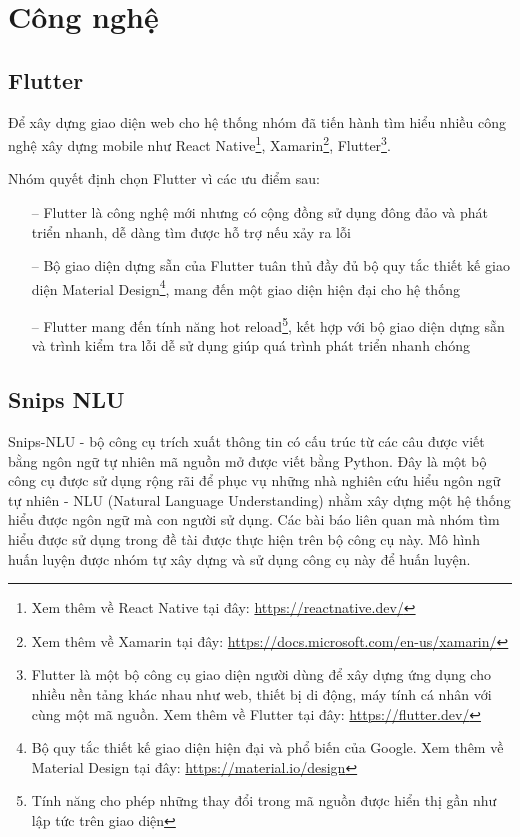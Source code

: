 \section{Công nghệ}

\subsection{Flutter}
Để xây dựng giao diện web cho hệ thống nhóm đã tiến hành tìm hiểu nhiều công nghệ xây dựng mobile như React Native\footnote{Xem thêm về React Native tại đây: \url{https://reactnative.dev/}}, Xamarin\footnote{Xem thêm về Xamarin tại đây: \url{https://docs.microsoft.com/en-us/xamarin/}}, Flutter\footnote{Flutter là một bộ công cụ giao diện người dùng để xây dựng ứng dụng cho nhiều nền tảng khác nhau như web, thiết bị di động, máy tính cá nhân với cùng một mã nguồn. Xem thêm về Flutter tại đây: \url{https://flutter.dev/}}.

Nhóm quyết định chọn Flutter vì các ưu điểm sau:
\begin{itemize}
    \item[--] Flutter là công nghệ mới nhưng có cộng đồng sử dụng đông đảo và phát triển nhanh, dễ dàng tìm được hỗ trợ nếu xảy ra lỗi
    \item[--] Bộ giao diện dựng sẵn của Flutter tuân thủ đầy đủ bộ quy tắc thiết kế giao diện Material Design\footnote{Bộ quy tắc thiết kế giao diện hiện đại và phổ biến của Google. Xem thêm về Material Design tại đây: \url{https://material.io/design}}, mang đến một giao diện hiện đại cho hệ thống
    \item[--] Flutter mang đến tính năng hot reload\footnote{Tính năng cho phép những thay đổi trong mã nguồn được hiển thị gần như lập tức trên giao diện}, kết hợp với bộ giao diện dựng sẵn và trình kiểm tra lỗi dễ sử dụng giúp quá trình phát triển nhanh chóng
\end{itemize}

\subsection{Snips NLU}
Snips-NLU - bộ công cụ trích xuất thông tin có cấu trúc từ các câu được viết bằng ngôn ngữ tự nhiên mã nguồn mở được viết bằng Python.
Đây là một bộ công cụ được sử dụng rộng rãi để phục vụ những nhà nghiên cứu hiểu ngôn ngữ tự nhiên - NLU (Natural Language Understanding) nhằm xây dựng một hệ thống hiểu được ngôn ngữ mà con người sử dụng. Các bài báo liên quan mà nhóm tìm hiểu được sử dụng trong đề tài được thực hiện trên bộ công cụ này. Mô hình huấn luyện được nhóm tự xây dựng và sử dụng công cụ này để huấn luyện.

